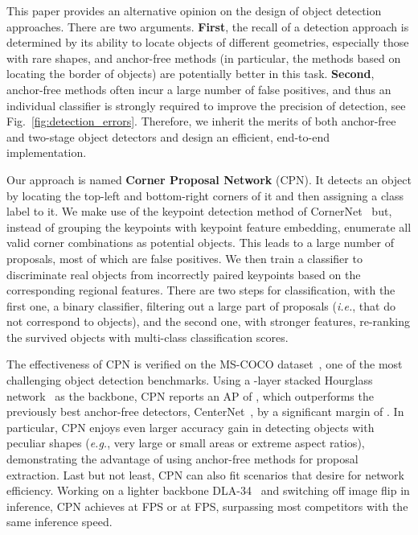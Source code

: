 \documentclass[runningheads]{llncs}
\begin{document}
This paper provides an alternative opinion on the design of object detection approaches. There are two arguments.  \textbf{First}, the recall of a detection approach is determined by its ability to locate objects of different geometries, especially those with rare shapes, and anchor-free methods (in particular, the methods based on locating the border of objects) are potentially better in this task. \textbf{Second}, anchor-free methods often incur a large number of false positives, and thus an individual classifier is strongly required to improve the precision of detection, see Fig.~\ref{fig:detection_errors}. Therefore, we inherit the merits of both anchor-free and two-stage object detectors and design an efficient, end-to-end implementation.

Our approach is named \textbf{Corner Proposal Network} (CPN). It detects an object by locating the top-left and bottom-right corners of it and then assigning a class label to it. We make use of the keypoint detection method of CornerNet~\cite{law2018cornernet} but, instead of grouping the keypoints with keypoint feature embedding, enumerate all valid corner combinations as potential objects. This leads to a large number of proposals, most of which are false positives. We then train a classifier to discriminate real objects from incorrectly paired keypoints based on the corresponding regional features. There are two steps for classification, with the first one, a binary classifier,  filtering out a large part of proposals (\textit{i.e.}, that do not correspond to objects), and the second one, with stronger features, re-ranking the survived objects with multi-class classification scores.

The effectiveness of CPN is verified on the MS-COCO dataset~\cite{lin2014microsoft}, one of the most challenging object detection benchmarks. Using a -layer stacked Hourglass network~\cite{newell2016stacked} as the backbone, CPN reports an AP of , which outperforms the previously best anchor-free detectors, CenterNet~\cite{duan2019centernet}, by a significant margin of . In particular, CPN enjoys even larger accuracy gain in detecting objects with peculiar shapes (\textit{e.g.}, very large or small areas or extreme aspect ratios), demonstrating the advantage of using anchor-free methods for proposal extraction. Last but not least, CPN can also fit scenarios that desire for network efficiency. Working on a lighter backbone DLA-34~\cite{yu2018deep} and switching off image flip in inference, CPN achieves  at  FPS or  at  FPS, surpassing most competitors with the same inference speed.
\vspace{-0.5ex}
\end{document}
